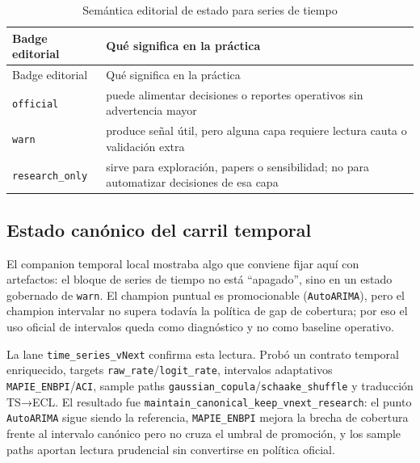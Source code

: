 \documentclass[
  spanish,
  11pt,
  letterpaper,
]{scrbook}
\theoremstyle{plain}
\theoremstyle{remark}
\begin{document}
\begin{longtable}[]{@{}
  >{\raggedright\arraybackslash}p{}
  >{\raggedright\arraybackslash}p{}@{}}
\caption{Semántica editorial de estado para series de
tiempo}\label{tbl-ts-status-badges}\tabularnewline
\toprule\noalign{}
\begin{minipage}[b]{\linewidth}\raggedright
Badge editorial
\end{minipage} & \begin{minipage}[b]{\linewidth}\raggedright
Qué significa en la práctica
\end{minipage} \\
\midrule\noalign{}
\endfirsthead
\toprule\noalign{}
\begin{minipage}[b]{\linewidth}\raggedright
Badge editorial
\end{minipage} & \begin{minipage}[b]{\linewidth}\raggedright
Qué significa en la práctica
\end{minipage} \\
\midrule\noalign{}
\endhead
\bottomrule\noalign{}
\endlastfoot
\texttt{official} & puede alimentar decisiones o reportes operativos sin
advertencia mayor \\
\texttt{warn} & produce señal útil, pero alguna capa requiere lectura
cauta o validación extra \\
\texttt{research\_only} & sirve para exploración, papers o sensibilidad;
no para automatizar decisiones de esa capa \\
\end{longtable}

\subsection{Estado canónico del carril
temporal}\label{estado-canuxf3nico-del-carril-temporal}

El companion temporal local mostraba algo que conviene fijar aquí con
artefactos: el bloque de series de tiempo no está ``apagado'', sino en
un estado gobernado de \texttt{warn}. El champion puntual es
promocionable (\texttt{AutoARIMA}), pero el champion intervalar no
supera todavía la política de gap de cobertura; por eso el uso oficial
de intervalos queda como diagnóstico y no como baseline operativo.

La lane \texttt{time\_series\_vNext} confirma esta lectura. Probó un
contrato temporal enriquecido, targets
\texttt{raw\_rate}/\texttt{logit\_rate}, intervalos adaptativos
\texttt{MAPIE\_ENBPI}/\texttt{ACI}, sample paths
\texttt{gaussian\_copula}/\texttt{schaake\_shuffle} y traducción TS→ECL.
El resultado fue \texttt{maintain\_canonical\_keep\_vnext\_research}: el
punto \texttt{AutoARIMA} sigue siendo la referencia,
\texttt{MAPIE\_ENBPI} mejora la brecha de cobertura frente al intervalo
canónico pero no cruza el umbral de promoción, y los sample paths
aportan lectura prudencial sin convertirse en política oficial.
\end{document}
